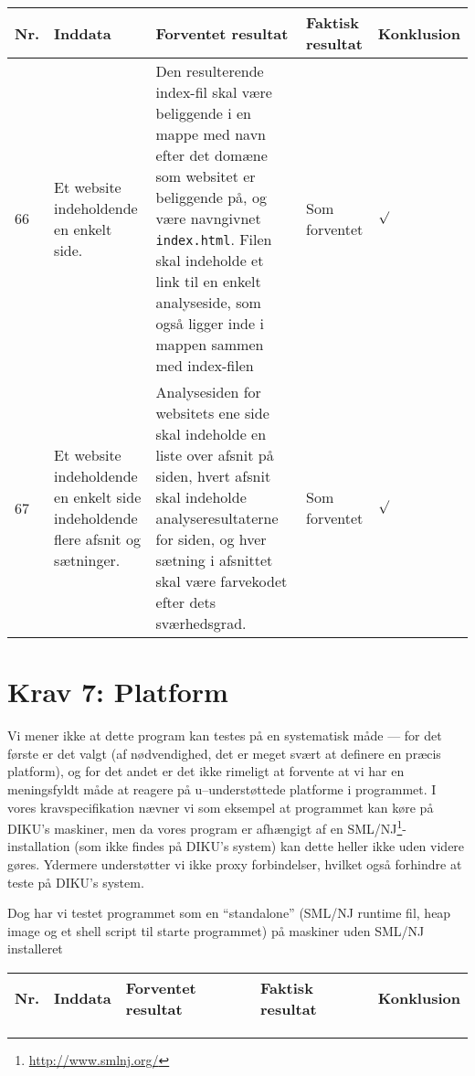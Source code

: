 \documentclass[a4paper,oneside,article]{memoir}
\begin{document}
\begin{landscape}
\begin{longtable}[c]{p{20pt}|p{220pt}|p{130pt}|p{130pt}|p{50pt}}
\textbf{Nr.} &
\textbf{Inddata} &
\textbf{Forventet resultat} &
\textbf{Faktisk resultat} &
\textbf{Konklusion} \\ \hline

66 & 
Et website indeholdende en enkelt side. & 
Den resulterende index-fil skal være beliggende i en mappe med navn
efter det domæne som websitet er beliggende på, og være navngivnet
\texttt{index.html}. Filen skal indeholde et link til en enkelt
analyseside, som også ligger inde i mappen sammen med index-filen & 
Som forventet & 
$\surd$ \\ \hline

67 & 
Et website indeholdende en enkelt side indeholdende flere afsnit og
sætninger. &
Analysesiden for websitets ene side skal indeholde en liste over
afsnit på siden, hvert afsnit skal indeholde analyseresultaterne for
siden, og hver sætning i afsnittet skal være farvekodet efter dets
sværhedsgrad. & 
Som forventet & 
$\surd$ \\ \hline

\end{longtable}

\section{Krav 7: Platform}

Vi mener ikke at dette program kan testes på en systematisk måde ---
for det første er det valgt (af nødvendighed, det er meget svært at
definere en præcis platform), og for det andet er det ikke rimeligt at
forvente at vi har en meningsfyldt måde at reagere på u--understøttede
platforme i programmet. I vores kravspecifikation nævner vi som
eksempel at programmet kan køre på DIKU's maskiner, men da vores
program er afhængigt af en
SML/NJ\footnote{\url{http://www.smlnj.org/}}-installation (som ikke
findes på DIKU's system) kan dette heller ikke uden videre gøres.
Ydermere understøtter vi ikke proxy forbindelser, hvilket også forhindre 
at teste på DIKU's system.

Dog har vi testet programmet som en ``standalone'' (SML/NJ runtime fil, heap image og et shell script til starte programmet) på maskiner uden SML/NJ installeret 

\begin{longtable}[c]{p{20pt}|p{220pt}|p{130pt}|p{130pt}|r}
\textbf{Nr.} &
\textbf{Inddata} &
\textbf{Forventet resultat} &
\textbf{Faktisk resultat} &
\textbf{Konklusion} \\ \hline


\end{longtable}
\end{landscape}
\end{document}
